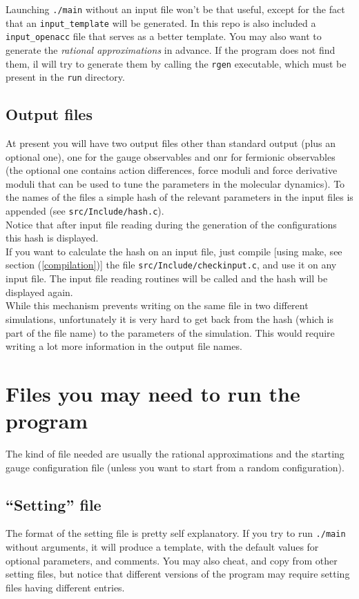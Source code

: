 Launching \verb|./main| without an input file won't be that useful,
except for the fact that an \verb|input_template| will be generated.
In this repo is also included a \verb|input_openacc| file that serves as
a better template.
You may also want to generate the \emph{rational approximations} in advance. If 
the
program does not find them, il will try to generate them by calling 
the \verb|rgen| executable, which must be present in the \verb|run| directory.

\subsection{Output files}
At present you will have two output files other than standard output (plus an 
optional one), one for the gauge observables and onr for fermionic observables 
(the optional one contains action differences, force moduli and force 
derivative moduli that can be used to tune the parameters in the molecular 
dynamics). To the names of the files a simple hash of the relevant parameters 
in the input files is appended (see \verb|src/Include/hash.c|).\\
Notice that after input file reading during the generation of the 
configurations this hash is displayed.\\
If you want to calculate the hash on an input file, just compile [using make, 
see section (\ref{compilation})] the file \verb|src/Include/checkinput.c|, and 
use it on any input file. The input file reading routines will be called and 
the hash will be displayed again.\\
While this mechanism prevents writing on the same file in two 
different simulations, unfortunately it is very hard to get back from the hash 
(which is part of the file name) to the parameters of the simulation. This 
would require writing a lot more information in the output file names.

\section{Files you may need to run the program}
\label{filesneeded}
The kind of file needed are usually the rational approximations and
the starting gauge configuration file (unless you want to start from
a random configuration).

\subsection{``Setting'' file}
The format of the setting file is pretty self explanatory. If you try
to run \verb|./main| without arguments, it will produce a template, with the 
default values for optional parameters, and comments. You may also cheat, and 
copy from other setting files, but notice that different versions of the program 
may require setting files having different entries.

